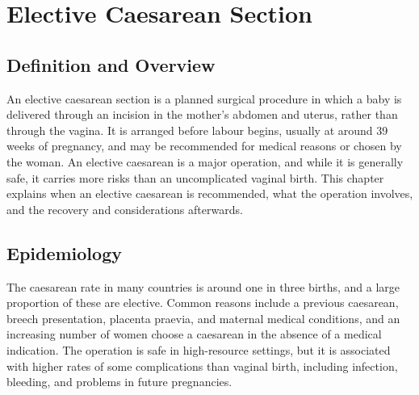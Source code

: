 \chapter{Elective Caesarean Section}

\section*{Definition and Overview}
An elective caesarean section is a planned surgical procedure in which a baby is delivered through an incision in the mother's abdomen and uterus, rather than through the vagina. It is arranged before labour begins, usually at around 39 weeks of pregnancy, and may be recommended for medical reasons or chosen by the woman. An elective caesarean is a major operation, and while it is generally safe, it carries more risks than an uncomplicated vaginal birth. This chapter explains when an elective caesarean is recommended, what the operation involves, and the recovery and considerations afterwards.

\section*{Epidemiology}
The caesarean rate in many countries is around one in three births, and a large proportion of these are elective. Common reasons include a previous caesarean, breech presentation, placenta praevia, and maternal medical conditions, and an increasing number of women choose a caesarean in the absence of a medical indication. The operation is safe in high-resource settings, but it is associated with higher rates of some complications than vaginal birth, including infection, bleeding, and problems in future pregnancies.

